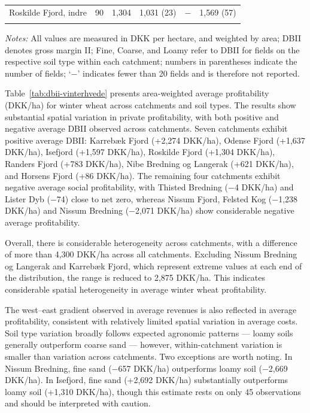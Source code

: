 \documentclass[12pt]{article}
\begin{document}
\begin{table}[H]
\begin{threeparttable}
\begin{tabular}{lrrrrr}
Roskilde Fjord, indre      &  90 & 1,304    & 1,031 (23)    & $-$            & 1,569 (57) \\
\addlinespace\bottomrule
\end{tabular}
\begin{tablenotes}
\footnotesize
\item \textit{Notes:} All values are measured in DKK per hectare, and weighted by area;
DBII denotes gross margin II; Fine, Coarse, and Loamy refer to DBII for fields on the
respective soil type within each catchment; numbers in parentheses indicate the number of
fields; `$-$' indicates fewer than 20 fields and is therefore not reported.
\end{tablenotes}
\end{threeparttable}
\end{table}


Table~\ref{tab:dbii-vinterhvede} presents area-weighted average profitability (DKK/ha) for winter wheat across catchments and soil types.  The results show substantial spatial variation in private profitability, with both positive and negative average DBII observed across catchments. 
Seven catchments exhibit positive average DBII: Karrebæk Fjord (+2,274 DKK/ha), Odense Fjord (+1,637 DKK/ha), Isefjord (+1,597 DKK/ha), Roskilde Fjord (+1,304 DKK/ha), Randers Fjord (+783 DKK/ha), Nibe Bredning og Langerak (+621 DKK/ha), and Horsens Fjord (+86 DKK/ha). 
The remaining four catchments exhibit negative average social profitability, with Thisted Bredning ($-$4 DKK/ha) and Lister Dyb ($-$74) close to net zero, whereas Nissum Fjord, Felsted Kog ($-$1,238 DKK/ha) and Nissum Bredning ($-$2,071 DKK/ha) show considerable negative average profitability. 

Overall, there is considerable heterogeneity across catchments, with a difference of more than 4,300 DKK/ha across all catchments. Excluding Nissum Bredning og Langerak and Karrebæk Fjord, which represent extreme values at each end of the distribution, the range is reduced to 2,875 DKK/ha. 
This indicates considerable spatial heterogeneity in average winter wheat profitability.

The west--east gradient observed in average revenues is also reflected in average profitability, consistent with relatively limited spatial variation in average costs. Soil type variation broadly follows expected agronomic patterns --- loamy soils generally outperform coarse sand --- however, within-catchment variation is smaller than variation across catchments. 
Two exceptions are worth noting. 
In Nissum Bredning, fine sand ($-$657 DKK/ha) outperforms loamy soil ($-$2,669 DKK/ha). 
In Isefjord, fine sand (+2,692 DKK/ha) substantially outperforms loamy soil (+1,310 DKK/ha), though this estimate rests on only 45 observations and should be interpreted with caution.
\end{document}
